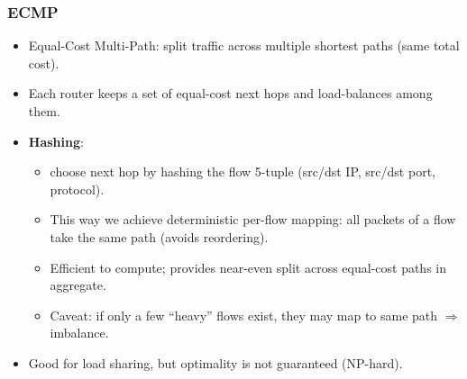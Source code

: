 
\subsubsection{ECMP}


\begin{itemize}
	\item Equal-Cost Multi-Path: split traffic across multiple shortest paths (same total cost).
	\item Each router keeps a set of equal-cost next hops and load-balances among them.
	\item \textbf{Hashing}:
	\begin{itemize}
		\item choose next hop by hashing the flow 5-tuple (src/dst IP, src/dst port, protocol).
		\item This way we achieve deterministic per-flow mapping: all packets of a flow take the same path (avoids reordering).
		\item Efficient to compute; provides near-even split across equal-cost paths in aggregate.
		\item Caveat: if only a few “heavy” flows exist, they may map to same path \(\Rightarrow\) imbalance.
	\end{itemize}
	\item Good for load sharing, but optimality is not guaranteed (NP-hard).
\end{itemize}


